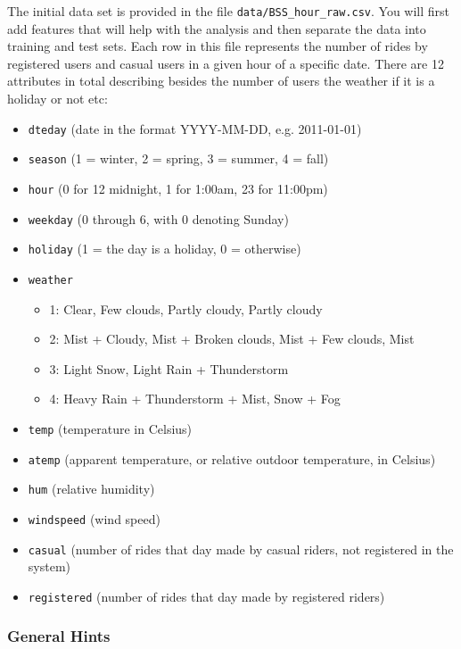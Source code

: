 \documentclass[11pt]{article}
\providecommand{\tightlist}{%
      \setlength{\itemsep}{0pt}\setlength{\parskip}{0pt}}
\begin{document}
The initial data set is provided in the file
\texttt{data/BSS\_hour\_raw.csv}. You will first add features that will
help with the analysis and then separate the data into training and test
sets. Each row in this file represents the number of rides by registered
users and casual users in a given hour of a specific date. There are 12
attributes in total describing besides the number of users the weather
if it is a holiday or not etc:

\begin{itemize}
\tightlist
\item
  \texttt{dteday} (date in the format YYYY-MM-DD, e.g. 2011-01-01)
\item
  \texttt{season} (1 = winter, 2 = spring, 3 = summer, 4 = fall)
\item
  \texttt{hour} (0 for 12 midnight, 1 for 1:00am, 23 for 11:00pm)
\item
  \texttt{weekday} (0 through 6, with 0 denoting Sunday)
\item
  \texttt{holiday} (1 = the day is a holiday, 0 = otherwise)
\item
  \texttt{weather}

  \begin{itemize}
  \tightlist
  \item
    1: Clear, Few clouds, Partly cloudy, Partly cloudy
  \item
    2: Mist + Cloudy, Mist + Broken clouds, Mist + Few clouds, Mist
  \item
    3: Light Snow, Light Rain + Thunderstorm
  \item
    4: Heavy Rain + Thunderstorm + Mist, Snow + Fog
  \end{itemize}
\item
  \texttt{temp} (temperature in Celsius)
\item
  \texttt{atemp} (apparent temperature, or relative outdoor temperature,
  in Celsius)
\item
  \texttt{hum} (relative humidity)
\item
  \texttt{windspeed} (wind speed)
\item
  \texttt{casual} (number of rides that day made by casual riders, not
  registered in the system)
\item
  \texttt{registered} (number of rides that day made by registered
  riders)
\end{itemize}

    \subsubsection{General Hints}\label{general-hints}
\end{document}
